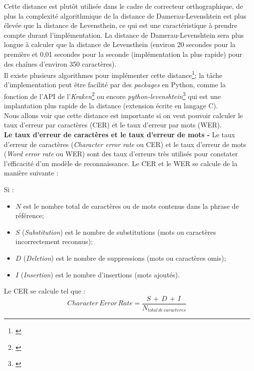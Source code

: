 Cette distance est plutôt utilisée dans le cadre de correcteur orthographique, de plus la complexité algorithmique de la distance de Damerau-Levenshtein est plus élevée que la distance de Levensthein, ce qui est une caractéristique à prendre compte durant l'implémentation. La distance de Damerau-Levenshtein sera plus longue à calculer que la distance de Levensthein (environ 20 secondes pour la première et 0,01 secondes pour la seconde (implémentation la plus rapide) pour des chaînes d'environ 350 caractères).\\

Il existe plusieurs algorithmes pour implémenter cette distance\footnote{\cite{wikibooks_algorithm_2020}}; la tâche d'implementation peut être facilité par des \textit{packages} en Python, comme la fonction  de l'API de l'\textit{Kraken}\footnote{\cite{noauthor_kraken_nodate}} ou encore  \textit{python-levenshtein}\footnote{\cite{noauthor_python-levenshtein_nodate}} qui est une implantation plus rapide de la distance (extension écrite en langage C).\\

Nous allons voir que cette distance est importante si on veut pouvoir calculer le taux d'erreur par caractères (CER) et le taux d'erreur par mots (WER).\\ 

\textbf{Le taux d'erreur de caractères et le taux d'erreur de mots -} Le taux d'erreur de caractères (\textit{Character error rate} ou CER) et le taux d'erreur de mots (\textit{Word error rate} ou WER) sont des taux d'erreurs très utilisés pour constater l'efficacité d'un modèle de reconnaissance. Le CER et le WER se calcule de la manière suivante :

Si : 

\begin{itemize}
    \item $N$ est le nombre total de caractères ou de mots contenus dans la phrase de référence;
    \item $S$ (\textit{Substitution}) est le nombre de substitutions (mots ou caractères incorrectement reconnus);
    \item $D$ (\textit{Deletion}) est le nombre de suppressions (mots ou caractères omis);
    \item $I$ (\textit{Insertion}) est le nombre d'insertions (mots ajoutés).
\end{itemize}

Le CER se calcule tel que : $$ Character\, Error\, Rate = \frac{S\, + \,D\, + \,I\,}{N_{total\, de\, caracteres}} $$

